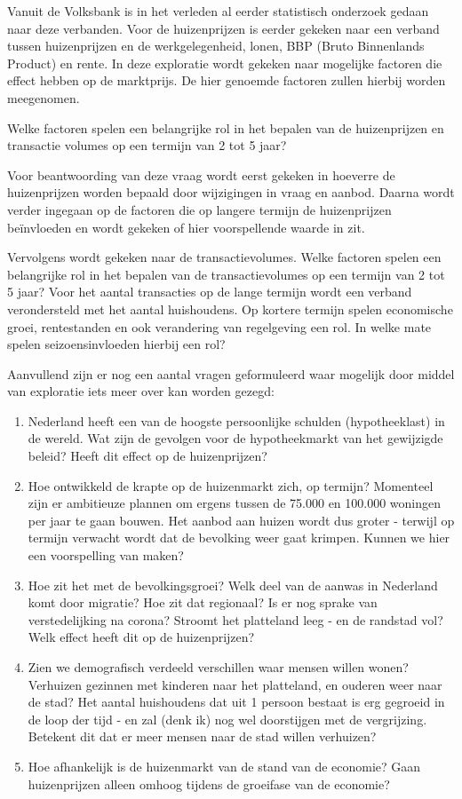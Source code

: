 \documentclass[
]{article}
\begin{document}
Vanuit de Volksbank is in het verleden al eerder statistisch onderzoek
gedaan naar deze verbanden. Voor de huizenprijzen is eerder gekeken naar
een verband tussen huizenprijzen en de werkgelegenheid, lonen, BBP
(Bruto Binnenlands Product) en rente. In deze exploratie wordt gekeken
naar mogelijke factoren die effect hebben op de marktprijs. De hier
genoemde factoren zullen hierbij worden meegenomen.

Welke factoren spelen een belangrijke rol in het bepalen van de
huizenprijzen en transactie volumes op een termijn van 2 tot 5 jaar?

Voor beantwoording van deze vraag wordt eerst gekeken in hoeverre de
huizenprijzen worden bepaald door wijzigingen in vraag en aanbod. Daarna
wordt verder ingegaan op de factoren die op langere termijn de
huizenprijzen beïnvloeden en wordt gekeken of hier voorspellende waarde
in zit.

Vervolgens wordt gekeken naar de transactievolumes. Welke factoren
spelen een belangrijke rol in het bepalen van de transactievolumes op
een termijn van 2 tot 5 jaar? Voor het aantal transacties op de lange
termijn wordt een verband verondersteld met het aantal huishoudens. Op
kortere termijn spelen economische groei, rentestanden en ook
verandering van regelgeving een rol. In welke mate spelen
seizoensinvloeden hierbij een rol?

Aanvullend zijn er nog een aantal vragen geformuleerd waar mogelijk door
middel van exploratie iets meer over kan worden gezegd:

\begin{enumerate}
\def\labelenumi{\arabic{enumi}.}
\item
  Nederland heeft een van de hoogste persoonlijke schulden
  (hypotheeklast) in de wereld. Wat zijn de gevolgen voor de
  hypotheekmarkt van het gewijzigde beleid? Heeft dit effect op de
  huizenprijzen?
\item
  Hoe ontwikkeld de krapte op de huizenmarkt zich, op termijn? Momenteel
  zijn er ambitieuze plannen om ergens tussen de 75.000 en 100.000
  woningen per jaar te gaan bouwen. Het aanbod aan huizen wordt dus
  groter - terwijl op termijn verwacht wordt dat de bevolking weer gaat
  krimpen. Kunnen we hier een voorspelling van maken?
\item
  Hoe zit het met de bevolkingsgroei? Welk deel van de aanwas in
  Nederland komt door migratie? Hoe zit dat regionaal? Is er nog sprake
  van verstedelijking na corona? Stroomt het platteland leeg - en de
  randstad vol? Welk effect heeft dit op de huizenprijzen?
\item
  Zien we demografisch verdeeld verschillen waar mensen willen wonen?
  Verhuizen gezinnen met kinderen naar het platteland, en ouderen weer
  naar de stad? Het aantal huishoudens dat uit 1 persoon bestaat is erg
  gegroeid in de loop der tijd - en zal (denk ik) nog wel doorstijgen
  met de vergrijzing. Betekent dit dat er meer mensen naar de stad
  willen verhuizen?
\item
  Hoe afhankelijk is de huizenmarkt van de stand van de economie? Gaan
  huizenprijzen alleen omhoog tijdens de groeifase van de economie?
\end{enumerate}
\end{document}
